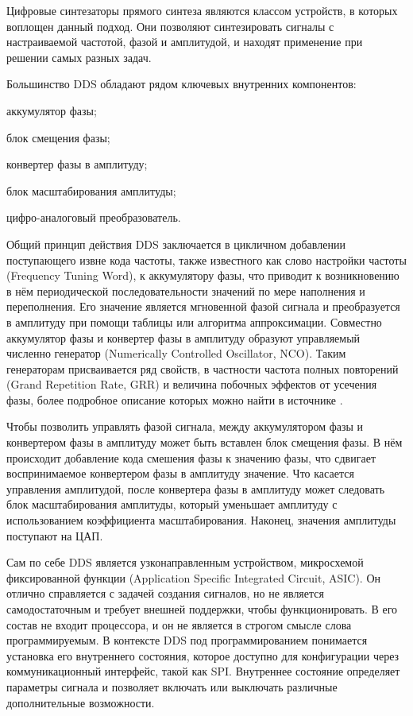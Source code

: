 \documentclass{report}
\begin{document}
Цифровые синтезаторы прямого синтеза являются классом устройств, в которых воплощен данный подход. Они позволяют синтезировать сигналы с настраиваемой частотой, фазой и амплитудой, и находят применение при решении самых разных задач.

Большинство DDS обладают рядом ключевых внутренних компонентов:

\begin{enummarker}
    \item аккумулятор фазы;
    \item блок смещения фазы;
    \item конвертер фазы в амплитуду;
    \item блок масштабирования амплитуды;
    \item цифро-аналоговый преобразователь.
\end{enummarker}

Общий принцип действия DDS заключается в цикличном добавлении поступающего извне кода частоты, также известного как слово настройки частоты (Frequency Tuning Word), к аккумулятору фазы, что приводит к возникновению в нём периодической последовательности значений по мере наполнения и переполнения. Его значение является мгновенной фазой сигнала и преобразуется в амплитуду при помощи таблицы или алгоритма аппроксимации. Совместно аккумулятор фазы и конвертер фазы в амплитуду образуют управляемый численно генератор (Numerically Controlled Oscillator, NCO). Таким генераторам присваивается ряд свойств, в частности частота полных повторений (Grand Repetition Rate, GRR) и величина побочных эффектов от усечения фазы, более подробное описание которых можно найти в источнике \cite{dds_tutorial}.

Чтобы позволить управлять фазой сигнала, между аккумулятором фазы и конвертером фазы в амплитуду может быть вставлен блок смещения фазы. В нём происходит добавление кода смешения фазы к значению фазы, что сдвигает воспринимаемое конвертером фазы в амплитуду значение. Что касается управления амплитудой, после конвертера фазы в амплитуду может следовать блок масштабирования амплитуды, который уменьшает амплитуду с использованием коэффициента масштабирования. Наконец, значения амплитуды поступают на ЦАП.

Сам по себе DDS является узконаправленным устройством, микросхемой фиксированной функции (Application Specific Integrated Circuit, ASIC). Он отлично справляется с задачей создания сигналов, но не является самодостаточным и требует внешней поддержки, чтобы функционировать. В его состав не входит процессора, и он не является в строгом смысле слова программируемым. В контексте DDS под программированием понимается установка его внутреннего состояния, которое доступно для конфигурации через коммуникационный интерфейс, такой как SPI. Внутреннее состояние определяет параметры сигнала и позволяет включать или выключать различные дополнительные возможности.
\end{document}
